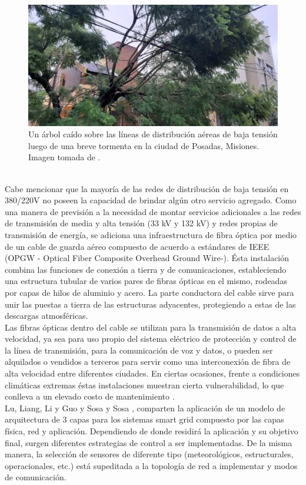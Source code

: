 \begin{figure}[h!]
	\centering
	\includegraphics[width=0.9\linewidth]{Figures/arbol_caido_linea_bt}
	\caption{Un árbol caído sobre las líneas de distribución aéreas de baja tensión luego de una breve tormenta en la ciudad de Posadas, Misiones. Imagen tomada de \citep{Noticia_MNES}.}
	\label{fig:arbolcaidolineabt}
\end{figure}\\
Cabe mencionar que la mayoría de las redes de distribución de baja tensión en 380/220V no poseen la capacidad de brindar algún otro servicio agregado. Como una manera de previsión a la necesidad de montar servicios adicionales a las redes de transmisión de media y alta tensión (33 kV y 132 kV) y redes propias de transmisión de energía, se adiciona una infraestructura de fibra óptica por medio de un cable de guarda aéreo compuesto de acuerdo a estándares de IEEE (OPGW - Optical Fiber Composite Overhead Ground Wire-). Ésta instalación combina las funciones de conexión a tierra y de comunicaciones, estableciendo una estructura tubular de varios pares de fibras ópticas en el mismo, rodeadas por capas de hilos de aluminio y acero. La parte conductora del cable sirve para unir las puestas a tierra de las estructuras adyacentes, protegiendo a estas de las descargas atmosféricas.\\
Las fibras ópticas dentro del cable se utilizan para la transmisión de datos a alta velocidad, ya sea para uso propio del sistema eléctrico de protección y control de la línea de transmisión, para la comunicación de voz y datos, o pueden ser alquilados o vendidos a terceros para servir como una interconexión de fibra de alta velocidad entre diferentes ciudades. En ciertas ocasiones, frente a condiciones climáticas extremas éstas instalaciones muestran cierta vulnerabilidad, lo que conlleva a un elevado costo de mantenimiento \citep{ARTICLE:1}.\\
Lu, Liang, Li y Guo \citep{ARTICLE:1} y Sosa y Sosa \citep{ARTICLE:2}, comparten la aplicación de un modelo de arquitectura de 3 capas para los sistemas smart grid compuesto por las capas física, red y aplicación. Dependiendo de donde residirá la aplicación y su objetivo final, surgen diferentes estrategias de control a ser implementadas. De la misma manera, la selección de sensores de diferente tipo (meteorológicos, estructurales, operacionales, etc.) est\'{a} supeditada a la topología de red a implementar y modos de comunicación.\\
